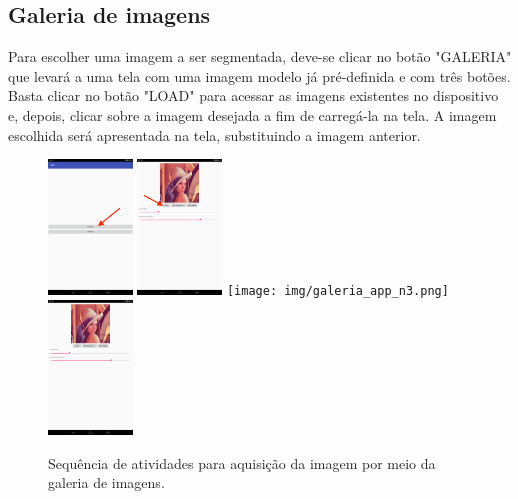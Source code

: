 \subsection{Galeria de imagens}

Para escolher uma imagem a ser segmentada, deve-se clicar no botão "GALERIA" que levará a uma tela com uma imagem modelo já pré-definida e com três botões. Basta clicar no botão "LOAD" para acessar as imagens existentes no dispositivo e, depois, clicar sobre a imagem desejada a fim de carregá-la na tela.
A imagem escolhida será apresentada na tela, substituindo a imagem anterior.
\begin{figure}[!htb]
 \centering
 \def\baselinestretch{1}\small\normalsize
 \includegraphics[width=0.2\textwidth]{img/galeria_app_n1.png}\qquad
 \includegraphics[width=0.2\textwidth]{img/galeria_app_n2.png}  \qquad 
 \texttt{[image: img/galeria\_app\_n3.png]}  \qquad
 \includegraphics[width=0.2\textwidth]{img/galeria_app_n4.png}        
 \caption{\label{fig:indiosegmentado}Sequência de atividades para aquisição da imagem por meio da galeria de imagens.}
\end{figure}


